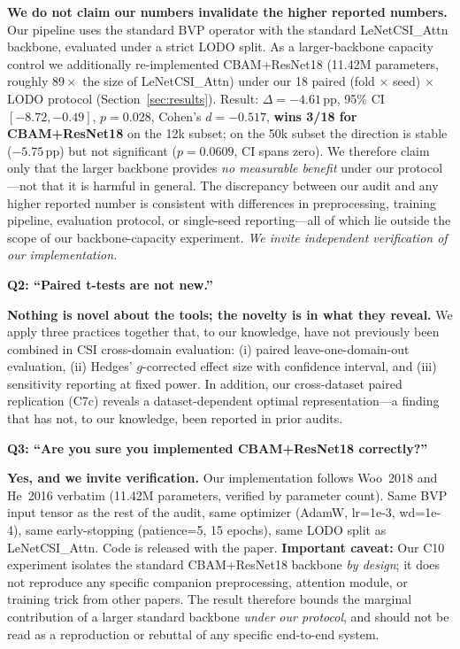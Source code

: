 \documentclass[11pt]{article}
\theoremstyle{definition}
\newcommand{\MDE}{\text{MDE}}
\begin{document}
\noindent\textbf{We do not claim our numbers invalidate the higher reported numbers.} Our pipeline uses the standard BVP operator with the standard LeNetCSI\_Attn backbone, evaluated under a strict LODO split. As a larger-backbone capacity control we additionally re-implemented CBAM+ResNet18 (11.42M parameters, roughly $89\times$ the size of LeNetCSI\_Attn) under our 18 paired (fold $\times$ seed) $\times$ LODO protocol (Section~\ref{sec:results}). Result: $\Delta = -4.61$\,pp, 95\% CI $[-8.72, -0.49]$, $p = 0.028$, Cohen's $d = -0.517$, \textbf{wins 3/18 for CBAM+ResNet18} on the 12k subset; on the 50k subset the direction is stable ($-5.75$\,pp) but not significant ($p = 0.0609$, CI spans zero). We therefore claim only that the larger backbone provides \emph{no measurable benefit} under our protocol---not that it is harmful in general. The discrepancy between our audit and any higher reported number is consistent with differences in preprocessing, training pipeline, evaluation protocol, or single-seed reporting---all of which lie outside the scope of our backbone-capacity experiment. \emph{We invite independent verification of our implementation.}

\medskip
\noindent\textbf{Q2: ``Paired t-tests are not new.''}

\noindent\textbf{Nothing is novel about the tools; the novelty is in what they reveal.} We apply three practices together that, to our knowledge, have not previously been combined in CSI cross-domain evaluation: (i) paired leave-one-domain-out evaluation, (ii) Hedges' $g$-corrected effect size with confidence interval, and (iii) \MDE{} sensitivity reporting at fixed power. In addition, our cross-dataset paired replication (C7c) reveals a dataset-dependent optimal representation---a finding that has not, to our knowledge, been reported in prior audits.

\medskip
\noindent\textbf{Q3: ``Are you sure you implemented CBAM+ResNet18 correctly?''}

\noindent\textbf{Yes, and we invite verification.} Our implementation follows Woo~2018 and He~2016 verbatim (11.42M parameters, verified by parameter count). Same BVP input tensor as the rest of the audit, same optimizer (AdamW, lr=1e-3, wd=1e-4), same early-stopping (patience=5, 15 epochs), same LODO split as LeNetCSI\_Attn. Code is released with the paper. \textbf{Important caveat:} Our C10 experiment isolates the standard CBAM+ResNet18 backbone \emph{by design}; it does not reproduce any specific companion preprocessing, attention module, or training trick from other papers. The result therefore bounds the marginal contribution of a larger standard backbone \emph{under our protocol}, and should not be read as a reproduction or rebuttal of any specific end-to-end system.
\end{document}

